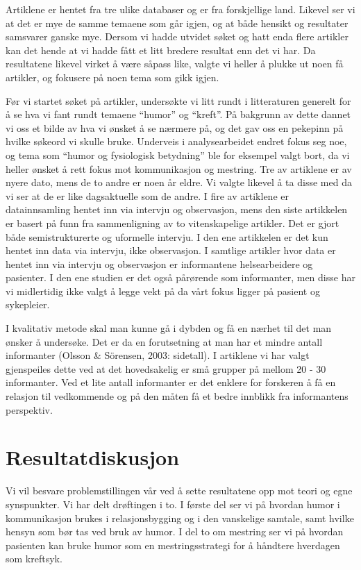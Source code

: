 Artiklene er hentet fra tre ulike databaser og er fra forskjellige land.
Likevel ser vi at det er mye de samme temaene som går igjen, og at både hensikt
og resultater samsvarer ganske mye. Dersom vi hadde utvidet søket og hatt enda
flere artikler kan det hende at vi hadde fått et litt bredere resultat enn det
vi har. Da resultatene likevel virket å være såpass like, valgte vi heller å
plukke ut noen få artikler, og fokusere på noen tema som gikk igjen.

Før vi startet søket på artikler, undersøkte vi litt rundt i litteraturen
generelt for å se hva vi fant rundt temaene “humor” og “kreft”. På bakgrunn av
dette dannet vi oss et bilde av hva vi ønsket å se nærmere på, og det gav oss
en pekepinn på hvilke søkeord vi skulle bruke. Underveis i analysearbeidet
endret fokus seg noe, og tema som “humor og fysiologisk betydning” ble for
eksempel valgt bort, da vi heller ønsket å rett fokus mot kommunikasjon og
mestring.  Tre av artiklene er av nyere dato, mens de to andre er noen år
eldre. Vi valgte likevel å ta disse med da vi ser at de er like dagsaktuelle
som de andre.  I fire av artiklene er datainnsamling hentet inn via intervju og
observasjon, mens den siste artikkelen er basert på funn fra sammenligning av
to vitenskapelige artikler. Det er gjort både semistrukturerte og uformelle
intervju. I den ene artikkelen er det kun hentet inn data via intervju, ikke
observasjon. I samtlige artikler hvor data er hentet inn via intervju og
observasjon er informantene helsearbeidere og pasienter. I den ene studien er
det også pårørende som informanter, men disse har vi midlertidig ikke valgt å
legge vekt på da vårt fokus ligger på pasient og sykepleier.

I kvalitativ metode skal man kunne gå i dybden og få en nærhet til det man
ønsker å undersøke. Det er da en forutsetning at man har et mindre antall
informanter (Olsson \&{} Sörensen, 2003: sidetall). I artiklene vi har valgt
gjenspeiles dette ved at  det hovedsakelig er små grupper på mellom 20 - 30
informanter. Ved et lite antall informanter er det enklere for forskeren å få
en relasjon til vedkommende og på den måten få et bedre innblikk fra
informantens perspektiv.

\section{Resultatdiskusjon}

Vi vil besvare problemstillingen vår ved å sette resultatene opp mot teori og
egne synspunkter. Vi har delt drøftingen i to. I første del ser vi på hvordan
humor i kommunikasjon brukes i relasjonsbygging og i den vanskelige samtale,
samt hvilke hensyn som bør tas ved bruk av humor. I del to om mestring ser vi
på hvordan pasienten kan bruke humor som en mestringsstrategi for å håndtere
hverdagen som kreftsyk.

